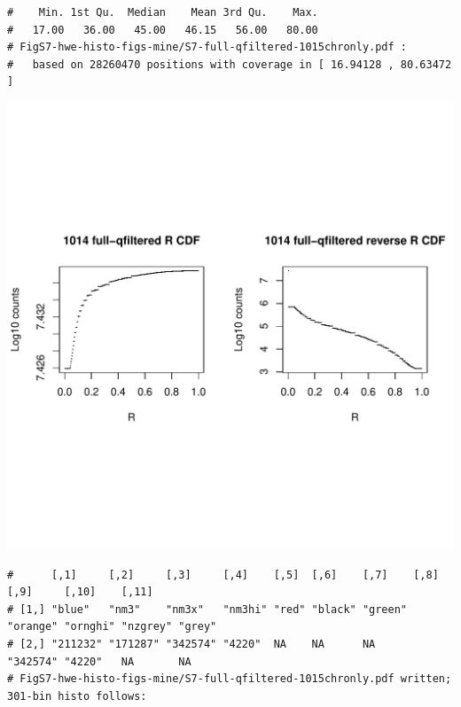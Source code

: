 \documentclass{article}\usepackage[]{graphicx}\usepackage[]{color}
\makeatletter
\def\maxwidth{ %
  \ifdim\Gin@nat@width>\linewidth
    \linewidth
  \else
    \Gin@nat@width
  \fi
}
\newenvironment{kframe}{%
 \def\at@end@of@kframe{}%
 \ifinner\ifhmode%
  \def\at@end@of@kframe{\end{minipage}}%
  \begin{minipage}{\columnwidth}%
 \fi\fi%
 \def\FrameCommand##1{\hskip\@totalleftmargin \hskip-\fboxsep
 \colorbox{shadecolor}{##1}\hskip-\fboxsep
     \hskip-\linewidth \hskip-\@totalleftmargin \hskip\columnwidth}%
 \MakeFramed {\advance\hsize-\width
   \@totalleftmargin\z@ \linewidth\hsize
   \@setminipage}}%
 {\par\unskip\endMakeFramed%
 \at@end@of@kframe}
\newenvironment{knitrout}{}{} %
\makeatother
\begin{document}
\begin{knitrout}
\begin{kframe}
\begin{verbatim}
#    Min. 1st Qu.  Median    Mean 3rd Qu.    Max. 
#   17.00   36.00   45.00   46.15   56.00   80.00 
# FigS7-hwe-histo-figs-mine/S7-full-qfiltered-1015chronly.pdf :
#   based on 28260470 positions with coverage in [ 16.94128 , 80.63472 ]
\end{verbatim}
\end{kframe}
\includegraphics[width=\maxwidth]{FigS7-hwe-histo-figs-knitr/unnamed-chunk-10-36} 
\begin{kframe}\begin{verbatim}
#      [,1]     [,2]     [,3]     [,4]    [,5]  [,6]    [,7]    [,8]     [,9]     [,10]    [,11] 
# [1,] "blue"   "nm3"    "nm3x"   "nm3hi" "red" "black" "green" "orange" "ornghi" "nzgrey" "grey"
# [2,] "211232" "171287" "342574" "4220"  NA    NA      NA      "342574" "4220"   NA       NA    
# FigS7-hwe-histo-figs-mine/S7-full-qfiltered-1015chronly.pdf written; 301-bin histo follows:
\end{verbatim}
\end{kframe}

\end{knitrout}
\end{document}
